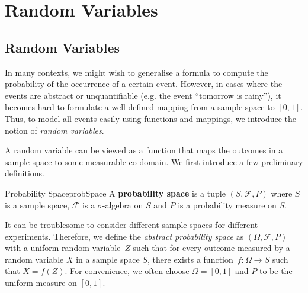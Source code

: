 \documentclass[math]{amznotes}
\theoremstyle{remark}
\newcommand{\0}{\mathbf{0}}
\newcommand{\1}{\mathbf{1}}
\begin{document}
\chapter{Random Variables}
\section{Random Variables}
In many contexts, we might wish to generalise a formula to compute the probability of the occurrence of a certain event. However, in cases where the events are abstract or unquantifiable (e.g. the event ``tomorrow is rainy''), it becomes hard to formulate a well-defined mapping from a sample space to $[0, 1]$. Thus, to model all events easily using functions and mappings, we introduce the notion of \textit{random variables}.

A random variable can be viewed as a function that maps the outcomes in a sample space to some measurable co-domain. We first introduce a few preliminary definitions.
\begin{dfnbox}{Probability Space}{probSpace}
    A {\color{red} \textbf{probability space}} is a tuple $\left(S, \mathcal{F}, P\right)$ where $S$ is a sample space, $\mathcal{F}$ is a $\sigma$-algebra on $S$ and $P$ is a probability measure on $S$.
\end{dfnbox}
It can be troublesome to consider different sample spaces for different experiments. Therefore, we define the \textit{abstract probability space} as $\left(\Omega, \mathcal{F}, P\right)$ with a uniform random variable~$Z$ such that for every outcome measured by a random variable $X$ in a sample space $S$, there exists a function~$f \colon \Omega \to S$ such that $X = f\left(Z\right)$. For convenience, we often choose $\Omega = \left[0, 1\right]$ and $P$ to be the uniform measure on $\left[0, 1\right]$.
\end{document}
